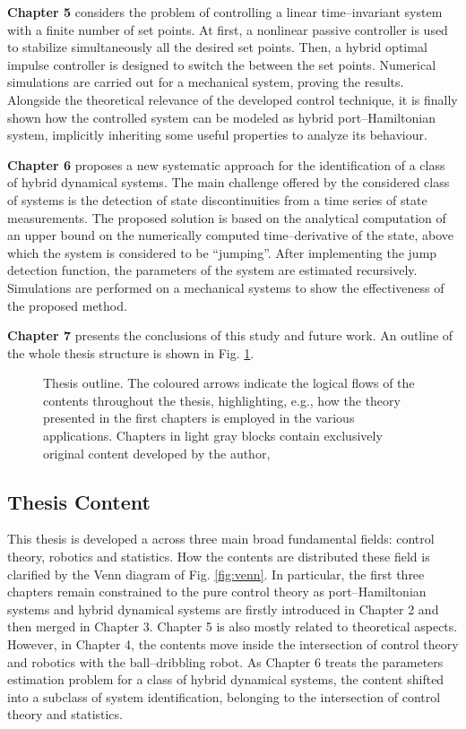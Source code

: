 %
\textbf{Chapter 5} considers the problem of controlling a linear time--invariant system with a finite number of set points. At first, a nonlinear passive controller is used to stabilize simultaneously all the desired set points. Then, a hybrid optimal impulse controller is designed to switch the between the set points. Numerical simulations are carried out for a mechanical system, proving the results. Alongside the theoretical relevance of the developed control technique, it is finally shown how the controlled system can be modeled as hybrid port--Hamiltonian system, implicitly inheriting some useful properties to analyze its behaviour.
%
\newline

%
\textbf{Chapter 6} proposes a new systematic approach for the identification of a class of hybrid dynamical systems. The main challenge offered by the considered class of systems is the detection of state discontinuities from a time series of state measurements. The proposed solution is based on the analytical computation of an upper bound on the numerically computed time--derivative of the state, above which the system is considered to be ``jumping''. After implementing the jump detection function, the parameters of the system are estimated recursively. Simulations are performed on a mechanical systems to show the effectiveness of the proposed method.
\newline

%
\textbf{Chapter 7} presents the conclusions of this study and future work. An outline of the whole thesis structure is shown in Fig. \ref{fig:ThesisStructure}.
%
\begin{figure}[b]
    \centering
    
    \vspace{5mm}
    \caption{Thesis outline. The coloured arrows indicate the logical flows of the contents throughout the thesis, highlighting, e.g., how the theory presented in the first chapters is employed in the various applications. Chapters in light gray blocks contain exclusively original content developed by the author,}
    \label{fig:ThesisStructure}
\end{figure}
%
%
%
\subsection{Thesis Content}
This thesis is developed a across three main broad fundamental fields: control theory, robotics and statistics. How the contents are distributed these field is clarified by the Venn diagram of Fig. \ref{fig:venn}. In particular, the first three chapters  remain constrained to the pure control theory as port--Hamiltonian systems and hybrid dynamical systems are firstly introduced in Chapter 2 and then merged in Chapter 3. Chapter 5 is also mostly related to theoretical aspects. However, in Chapter 4, the contents move inside the intersection of control theory and robotics with the ball--dribbling robot. As Chapter 6 treats the parameters estimation problem for a class of hybrid dynamical systems, the content shifted into a subclass of system identification, belonging to the intersection of control theory and statistics.

